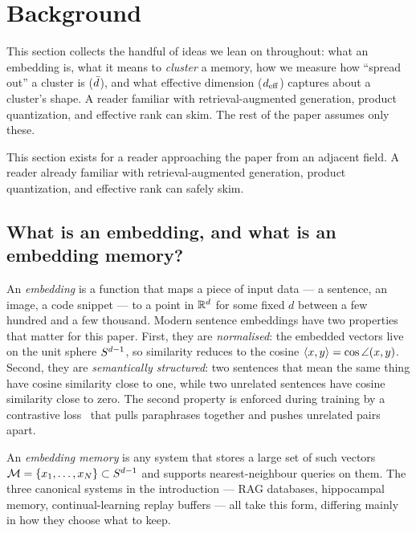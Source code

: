 \section{Background}
\label{sec:background}

\begin{intuition}
This section collects the handful of ideas we lean on throughout: what
an embedding is, what it means to \emph{cluster} a memory, how we
measure how ``spread out'' a cluster is ($\bar{d}$), and what effective
dimension (${d_{\mathrm{eff}}}$) captures about a cluster's shape. A reader
familiar with retrieval-augmented generation, product quantization,
and effective rank can skim. The rest of the paper assumes only these.
\end{intuition}

This section exists for a reader approaching the paper from an adjacent
field. A reader already familiar with retrieval-augmented generation,
product quantization, and effective rank can safely skim.

\subsection{What is an embedding, and what is an embedding memory?}
\label{sec:background:embedding}

An \emph{embedding} is a function that maps a piece of input data --- a
sentence, an image, a code snippet --- to a point in $\mathbb{R}^d$ for some
fixed $d$ between a few hundred and a few thousand. Modern sentence
embeddings have two properties that matter for this paper. First, they
are \emph{normalised}: the embedded vectors live on the unit sphere
$S^{d-1}$, so similarity reduces to the cosine $\left\langle x,y\right\rangle = \cos
\angle(x, y)$. Second, they are \emph{semantically structured}: two
sentences that mean the same thing have cosine similarity close to one,
while two unrelated sentences have cosine similarity close to zero. The
second property is enforced during training by a contrastive
loss~\cite{reimers2019sbert,gao2021simcse,xiao2023bge,wang2022e5} that
pulls paraphrases together and pushes unrelated pairs apart.

An \emph{embedding memory} is any system that stores a large set of such
vectors $\mathcal{M} = \{x_1, \ldots, x_N\} \subset S^{d-1}$ and supports
nearest-neighbour queries on them. The three canonical systems in the
introduction --- RAG databases, hippocampal memory, continual-learning
replay buffers --- all take this form, differing mainly in how they choose
what to keep.

